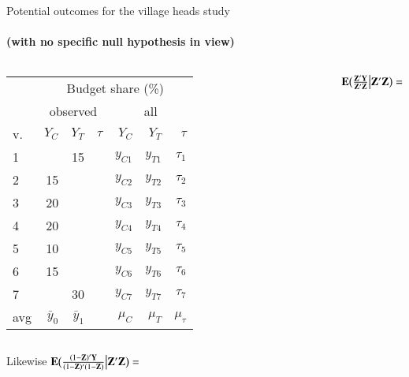\begin{frame}[t]{Potential outcomes for the village heads study}
\framesubtitle{(with no specific null hypothesis in view)}
  
\begin{columns}
\begin{tabular}{l|rrr|rrr} \hline
& \multicolumn{6}{c}{Budget share (\%)} \\
& \multicolumn{3}{c}{observed} & \multicolumn{3}{c}{all} \\
v. &$Y_{C}$& $Y_{T}$& $\tau$  &$Y_{C}$& $Y_{T}$& $\tau$ \\ \hline
1&     &15 &     & $y_{C1}$ & $y_{T1}$  & $\tau_{1}$\\
2& 15 &   &      & $y_{C2}$ & $y_{T2}$ & $\tau_{2}$\\ 
3& 20 &   &      & $y_{C3}$ & $y_{T3}$ & $\tau_{3}$\\
4& 20 &   &      & $y_{C4}$ & $y_{T4}$ & $\tau_{4}$\\
5& 10 &   &      & $y_{C5}$ & $y_{T5}$ & $\tau_{5}$\\
6& 15 &   &      & $y_{C6}$ & $y_{T6}$ & $\tau_{6}$\\
7&     & 30&     & $y_{C7}$ &$y_{T7}$ & $\tau_{7}$ \\ \hline
avg & $\bar{y}_{0} $ & $\bar{y}_{1}$ &  & $\mu_{C} $ & $\mu_{T}$ & $\mu_{\tau}$ \\ \hline
\end{tabular}
    
$\mathbf{E} \big( \frac{\mathbf{Z}'\mathbf{Y}}{\mathbf{Z}'\mathbf{Z}}\big|  \mathbf{Z}'\mathbf{Z} \big) =$\\[.5\textheight] 

\mbox{ }
\end{columns}
\vfill

Likewise $\mathbf{E} \big(
\frac{(1-\mathbf{Z})'\mathbf{Y}}{ (1-\mathbf{Z})'(1-\mathbf{Z})}\big|
\mathbf{Z}'\mathbf{Z} \big) =$ \hfill 
\hfill \mbox{} \\
\end{frame}


